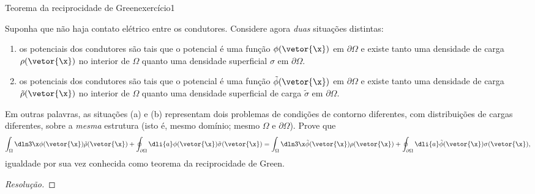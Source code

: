 \begin{exercício}{Teorema da reciprocidade de Green}{exercício1}
\begin{center}
    \end{center}
    Suponha que não haja contato elétrico entre os condutores. Considere agora \emph{duas} situações distintas:
    \begin{enumerate}[label=(\alph*)]
        \item os potenciais dos condutores são tais que o potencial é uma função \(\phi(\vetor{\x})\) em \(\partial \Omega\) e existe tanto uma densidade de carga \(\rho(\vetor{\x})\) no interior de \(\Omega\) quanto uma densidade superficial \(\sigma\) em \(\partial \Omega\).
        \item os potenciais dos condutores são tais que o potencial é uma função \(\tilde{\phi}(\vetor{\x})\) em \(\partial \Omega\) e existe tanto uma densidade de carga \(\tilde{\rho}(\vetor{\x})\) no interior de \(\Omega\) quanto uma densidade superficial de carga \(\tilde{\sigma}\) em \(\partial \Omega\).
    \end{enumerate}
    Em outras palavras, as situações (a) e (b) representam dois problemas de condições de contorno diferentes, com distribuições de cargas diferentes, sobre a \emph{mesma} estrutura (isto é, mesmo domínio; mesmo \(\Omega\) e \(\partial \Omega\)). Prove que
    \begin{equation*}
        \int_{\Omega}\dln3\x \phi(\vetor{\x}) \tilde{\rho}(\vetor{\x}) + \oint_{\partial \Omega}\dli{a} \phi(\vetor{\x})\tilde{\sigma}(\vetor{\x}) = \int_{\Omega}\dln3\x \tilde{\phi}(\vetor{\x})\rho(\vetor{\x}) + \oint_{\partial \Omega} \dli{a} \tilde{\phi}(\vetor{\x})\sigma(\vetor{\x}),
    \end{equation*}
    igualdade por sua vez conhecida como teorema da reciprocidade de Green.
\end{exercício}
\begin{proof}[Resolução]

\end{proof}

